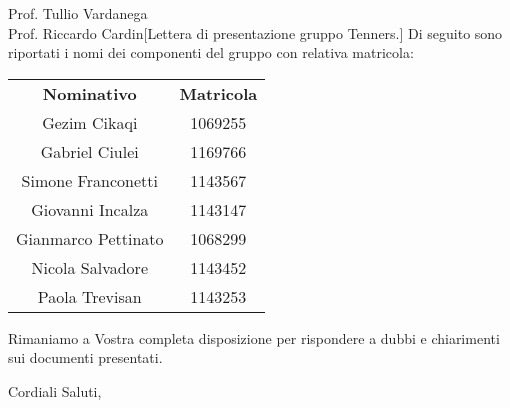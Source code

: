 \begin{letter}{Prof. Tullio Vardanega \\Prof. Riccardo Cardin}[Lettera di presentazione gruppo Tenners.]
    \noindent Di seguito sono riportati i nomi dei componenti del gruppo con relativa matricola:
    \begin{center}
        \begin{tabular}{c c}
        	\rowcolor{header}
    	    \textbf{Nominativo} & \textbf{Matricola} \\
    		Gezim Cikaqi & 1069255 \\
    		Gabriel Ciulei & 1169766\\
    		Simone Franconetti & 1143567\\
    		Giovanni Incalza & 1143147 \\
    		Gianmarco Pettinato & 1068299 \\
    		Nicola Salvadore & 1143452 \\
    		Paola Trevisan & 1143253\\
        \end{tabular}
     \end{center}
    Rimaniamo a Vostra completa disposizione per rispondere a dubbi e chiarimenti sui documenti presentati.

    \closing{Cordiali Saluti,}
\end{letter}